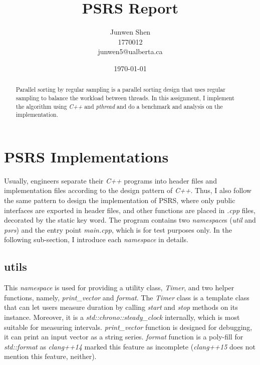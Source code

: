 \documentclass[11pt]{article}
\begin{document}
    \title{PSRS Report}
    \author{Junwen Shen\\1770012\\junwen5@ualberta.ca}
    \date{\today}

    \maketitle

    \begin{abstract}
        Parallel sorting by regular sampling\cite{psrs:1993} is a parallel sorting design that uses regular sampling to balance the workload between threads.
        In this assignment, I implement the algorithm using \textit{C++} and \textit{pthread} and do a benchmark and analysis on the implementation.
    \end{abstract}


    \section{PSRS Implementations}
    \label{sec:section-1}
    Usually, engineers separate their \textit{C++} programs into header files and implementation files according to the design pattern of \textit{C++}.
    Thus, I also follow the same pattern to design the implementation of PSRS, where only public interfaces are exported in header files, and other functions are placed in \textit{.cpp} files, decorated by the static key word.
    The program contains two \textit{namespace}s (\textit{util} and \textit{psrs}) and the entry point \textit{main.cpp}, which is for test purposes only.
    In the following sub-section, I introduce each \textit{namespace} in details.

    \subsection{utils}
    \label{subsec:section-1-1}
    This \textit{namespace} is used for providing a utility class, \textit{Timer}\cite{timer:2012}, and two helper functions, namely, \textit{print\_vector}\cite{print_vector:2012} and \textit{format}\cite{string_format:2014}.
    The \textit{Timer} class is a template class that can let users measure duration by calling \textit{start} and \textit{stop} methods on its instance.
    Moreover, it is a \textit{std::chrono::steady\_clock} internally, which is most suitable for measuring intervals\cite{std_steady_clock:2022}. \textit{print\_vector} function is designed for debugging, it can print an input vector as a string series. \textit{format} function is a poly-fill for \textit{std::format}\cite{std_format:cpp20} as \textit{clang++14} marked this feature as incomplete\cite{std_format:2022} (\textit{clang++15} does not mention this feature, neither).
\end{document}
